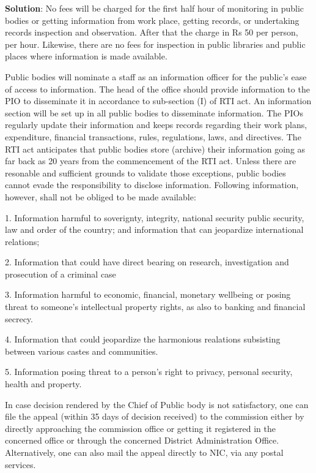 \documentclass[
]{book}
\newenvironment{solution}{ {\bfseries Solution}:}{}
\begin{document}
\begin{questions}
\begin{solution}
No fees will be charged for the first half hour of monitoring in public bodies or getting information from work place, getting records, or undertaking records inspection and observation. After that the charge in Rs 50 per person, per hour. Likewise, there are no fees for inspection in public libraries and public places where information is made available.

Public bodies will nominate a staff as an information officer for the public's ease of access to information. The head of the office should provide information to the PIO to disseminate it in accordance to sub-section (I) of RTI act. An information section will be set up in all public bodies to disseminate information. The PIOs regularly update their information and keeps records regarding their work plans, expenditure, financial transactions, rules, regulations, laws, and directives. The RTI act anticipates that public bodies store (archive) their information going as far back as 20 years from the commencement of the RTI act. Unless there are resonable and sufficient grounds to validate those exceptions, public bodies cannot evade the responsibility to disclose information. Following information, however, shall not be obliged to be made available:

1. Information harmful to soverignty, integrity, national security public security, law and order of the country; and information that can jeopardize international relations;

2. Information that could have direct bearing on research, investigation and prosecution of a criminal case

3. Information harmful to economic, financial, monetary wellbeing or posing threat to someone's intellectual property rights, as also to banking and financial secrecy.

4. Information that could jeopardize the harmonious realations subsisting between various castes and communities.

5. Information posing threat to a person's right to privacy, personal security, health and property.


In case decision rendered by the Chief of Public body is not satisfactory, one can file the appeal (within 35 days of decision received) to the commission either by directly approaching the commission office or getting it registered in the concerned office or through the concerned District Administration Office. Alternatively, one can also mail the appeal directly to NIC, via any postal services.


\end{solution}
\end{questions}
\end{document}
